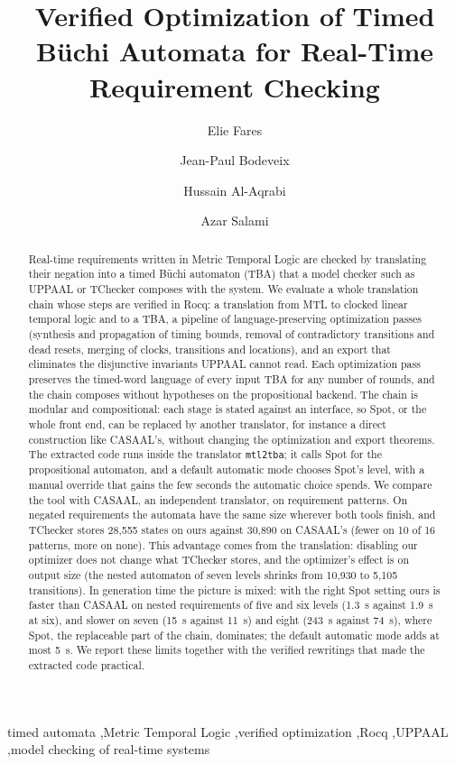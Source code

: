 \documentclass[preprint,review,12pt]{elsarticle}
\begin{document}
\begin{frontmatter}
\title{Verified Optimization of Timed B\"uchi Automata for Real-Time Requirement Checking}

\author[hct]{Elie Fares}
\author[irit]{Jean-Paul Bodeveix}
\author[hct]{Hussain Al-Aqrabi}
\author[hct]{Azar Salami}

\begin{abstract}
Real-time requirements written in Metric Temporal Logic are checked by translating their negation into a timed B\"uchi automaton (TBA) that a model checker such as UPPAAL or TChecker composes with the system. We evaluate a whole translation chain whose steps are verified in Rocq: a translation from MTL to clocked linear temporal logic and to a TBA, a pipeline of language-preserving optimization passes (synthesis and propagation of timing bounds, removal of contradictory transitions and dead resets, merging of clocks, transitions and locations), and an export that eliminates the disjunctive invariants UPPAAL cannot read. Each optimization pass preserves the timed-word language of every input TBA for any number of rounds, and the chain composes without hypotheses on the propositional backend. The chain is modular and compositional: each stage is stated against an interface, so Spot, or the whole front end, can be replaced by another translator, for instance a direct construction like CASAAL's, without changing the optimization and export theorems. The extracted code runs inside the translator \texttt{mtl2tba}; it calls Spot for the propositional automaton, and a default automatic mode chooses Spot's level, with a manual override that gains the few seconds the automatic choice spends. We compare the tool with CASAAL, an independent translator, on requirement patterns. On negated requirements the automata have the same size wherever both tools finish, and TChecker stores 28,555 states on ours against 30,890 on CASAAL's (fewer on 10 of 16 patterns, more on none). This advantage comes from the translation: disabling our optimizer does not change what TChecker stores, and the optimizer's effect is on output size (the nested automaton of seven levels shrinks from 10,930 to 5,105 transitions). In generation time the picture is mixed: with the right Spot setting ours is faster than CASAAL on nested requirements of five and six levels (1.3~s against 1.9~s at six), and slower on seven (15~s against 11~s) and eight (243~s against 74~s), where Spot, the replaceable part of the chain, dominates; the default automatic mode adds at most 5~s. We report these limits together with the verified rewritings that made the extracted code practical.
\end{abstract}

\begin{keyword}
timed automata \sep Metric Temporal Logic \sep verified optimization \sep Rocq \sep UPPAAL \sep model checking of real-time systems
\end{keyword}
\end{frontmatter}
\end{document}
